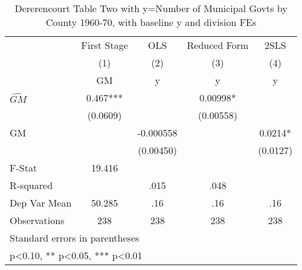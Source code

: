 \begin{table}[htbp]\centering
\def\sym#1{\ifmmode^{#1}\else\(^{#1}\)\fi}
\caption{Dererencourt Table Two with y=Number of Municipal Govts by County 1960-70, with baseline y and division FEs}
\begin{tabular}{l*{4}{c}}
\toprule
                    & First Stage   &         OLS   &Reduced Form   &        2SLS   \\
                    &\multicolumn{1}{c}{(1)}&\multicolumn{1}{c}{(2)}&\multicolumn{1}{c}{(3)}&\multicolumn{1}{c}{(4)}\\
                    &\multicolumn{1}{c}{GM}&\multicolumn{1}{c}{y}&\multicolumn{1}{c}{y}&\multicolumn{1}{c}{y}\\
\midrule
$\hat{GM}$          &       0.467***&               &     0.00998*  &               \\
                    &    (0.0609)   &               &   (0.00558)   &               \\
\addlinespace
GM                  &               &   -0.000558   &               &      0.0214*  \\
                    &               &   (0.00450)   &               &    (0.0127)   \\
\midrule
F-Stat              &      19.416   &               &               &               \\
R-squared           &               &        .015   &        .048   &               \\
Dep Var Mean        &      50.285   &         .16   &         .16   &         .16   \\
Observations        &         238   &         238   &         238   &         238   \\
\bottomrule
\multicolumn{5}{l}{\footnotesize Standard errors in parentheses}\\
\multicolumn{5}{l}{\footnotesize * p<0.10, ** p<0.05, *** p<0.01}\\
\end{tabular}
\end{table}
